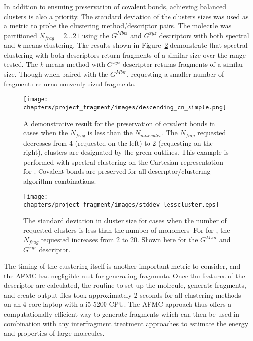 In addition to ensuring preservation of covalent bonds, achieving balanced clusters is also a priority.
The standard deviation of the clusters sizes was used as a metric to probe the clustering method/descriptor pairs.
The  molecule was partitioned  $N_{frag}=2\dots21$ using the $G^{Mbm}$ and $G^{xyz}$ descriptors with both spectral and $k$-means clustering.
The results shown in Figure~\ref{fig:h2o_variance} demonstrate that spectral clustering with both descriptors return fragments of a similar size over the range tested.  The
$k$-means method with $G^{xyz}$ descriptor  returns fragments of a similar size. Though when paired with the $G^{Mbm}$, requesting a smaller number of fragments returns unevenly sized fragments.

\begin{figure}[h!]
    \centering
    \texttt{[image: chapters/project\_fragment/images/descending\_cn\_simple.png]}
   \caption[Visualization of preservation of covalent bonds in ]{A demonstrative result for the preservation of covalent bonds in cases when the $N_{frag}$ is less than the $N_{molecules}$. The $N_{frag}$ requested decreases from 4 (requested on the left) to 2 (requesting on the right), clusters are designated by the green outlines. This example is performed with spectral clustering on the Cartesian representation for . Covalent bonds are preserved for all descriptor/clustering algorithm combinations.}
   \label{fig:descend_cn}

\end{figure}
\begin{figure}[h!]
    \centering
    \texttt{[image: chapters/project\_fragment/images/stddev\_lesscluster.eps]}
   \caption[Water cluster fragment size standard deviation]{The standard deviation in cluster size for cases when the number of requested clusters is less than the number of monomers. For for , the $N_{frag}$ requested increases from 2 to 20. Shown here for the $G^{Mbm}$ and $G^{xyz}$ descriptor.}
   \label{fig:h2o_variance}
\end{figure}

The timing of the clustering itself is another important metric to consider, and the AFMC has negligible cost for generating fragments.
Once the features of the descriptor are calculated, the routine to set up the molecule, generate fragments, and create output files took approximately 2 seconds for all clustering methods on an 4 core laptop with a i5-5200 CPU. 
The AFMC approach thus offers a computationally efficient way to generate fragments which can then be used in combination with any interfragment treatment approaches to estimate the energy and properties of large molecules.


